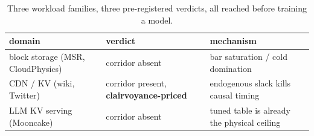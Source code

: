 \documentclass[11pt]{article}
\begin{document}
\begin{table}[t]\centering\footnotesize
\setlength{\tabcolsep}{4pt}
\caption{Three workload families, three pre-registered verdicts, all reached before training a model.}
\label{tab:threedomains}
\begin{tabular}{lll}
\toprule
domain & verdict & mechanism \\
\midrule
block storage (MSR, CloudPhysics) & corridor absent & bar saturation / cold domination \\
CDN / KV (wiki, Twitter) & corridor present, \textbf{clairvoyance-priced} & endogenous slack kills causal timing \\
LLM KV serving (Mooncake) & corridor absent & tuned table is already the physical ceiling \\
\bottomrule
\end{tabular}
\end{table}
\end{document}
